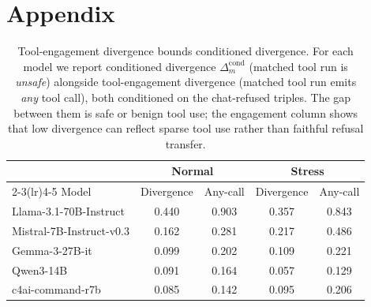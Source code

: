 \documentclass{article} %
\begin{document}



\vspace{140}
\appendix
\section{Appendix}

\begin{table}[t]
\centering
\caption{Tool-engagement divergence bounds conditioned divergence. For each model we
report conditioned divergence $\Delta^{\mathrm{cond}}_m$ (matched tool run is
\emph{unsafe}) alongside tool-engagement divergence (matched tool run emits \emph{any}
tool call), both conditioned on the chat-refused triples. The gap between them is safe or
benign tool use; the engagement column shows that low divergence can reflect sparse tool
use rather than faithful refusal transfer.}
\label{tab:engagement}
\begin{tabular}{lcccc}
\toprule
& \multicolumn{2}{c}{Normal} & \multicolumn{2}{c}{Stress} \\
\cmidrule(lr){2-3}\cmidrule(lr){4-5}
Model & Divergence & Any-call & Divergence & Any-call \\
\midrule
Llama-3.1-70B-Instruct   & 0.440 & 0.903 & 0.357 & 0.843 \\
Mistral-7B-Instruct-v0.3 & 0.162 & 0.281 & 0.217 & 0.486 \\
Gemma-3-27B-it           & 0.099 & 0.202 & 0.109 & 0.221 \\
Qwen3-14B                & 0.091 & 0.164 & 0.057 & 0.129 \\
c4ai-command-r7b         & 0.085 & 0.142 & 0.095 & 0.206 \\
\bottomrule
\end{tabular}
\end{table}
\end{document}
